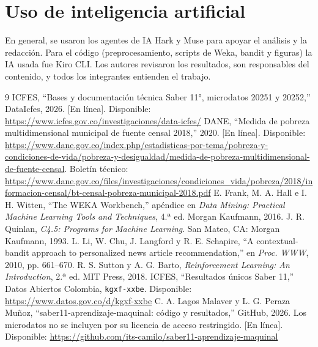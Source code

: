 \documentclass[conference]{IEEEtran}
\begin{document}
\section*{Uso de inteligencia artificial}
En general, se usaron los agentes de IA Hark y Muse para apoyar el análisis y la redacción. Para el código (preprocesamiento, scripts de Weka, bandit y figuras) la IA usada fue Kiro CLI. Los autores revisaron los resultados, son responsables del contenido, y todos los integrantes entienden el trabajo.

\begin{thebibliography}{9}
 ICFES, ``Bases y documentación técnica Saber 11°, microdatos 20251 y 20252,'' DataIcfes, 2026. [En línea]. Disponible: \url{https://www.icfes.gov.co/investigaciones/data-icfes/}
 DANE, ``Medida de pobreza multidimensional municipal de fuente censal 2018,'' 2020. [En línea]. Disponible: \url{https://www.dane.gov.co/index.php/estadisticas-por-tema/pobreza-y-condiciones-de-vida/pobreza-y-desigualdad/medida-de-pobreza-multidimensional-de-fuente-censal}. Boletín técnico: \url{https://www.dane.gov.co/files/investigaciones/condiciones_vida/pobreza/2018/informacion-censal/bt-censal-pobreza-municipal-2018.pdf}
 E. Frank, M. A. Hall e I. H. Witten, ``The WEKA Workbench,'' apéndice en \emph{Data Mining: Practical Machine Learning Tools and Techniques}, 4.ª ed. Morgan Kaufmann, 2016.
 J. R. Quinlan, \emph{C4.5: Programs for Machine Learning}. San Mateo, CA: Morgan Kaufmann, 1993.
 L. Li, W. Chu, J. Langford y R. E. Schapire, ``A contextual-bandit approach to personalized news article recommendation,'' en \emph{Proc. WWW}, 2010, pp. 661--670.
 R. S. Sutton y A. G. Barto, \emph{Reinforcement Learning: An Introduction}, 2.ª ed. MIT Press, 2018.
 ICFES, ``Resultados únicos Saber 11,'' Datos Abiertos Colombia, \texttt{kgxf-xxbe}. Disponible: \url{https://www.datos.gov.co/d/kgxf-xxbe}
 C. A. Lagos Malaver y L. G. Peraza Muñoz, ``saber11-aprendizaje-maquinal: código y resultados,'' GitHub, 2026. Los microdatos no se incluyen por su licencia de acceso restringido. [En línea]. Disponible: \url{https://github.com/its-camilo/saber11-aprendizaje-maquinal}
\end{thebibliography}
\end{document}
